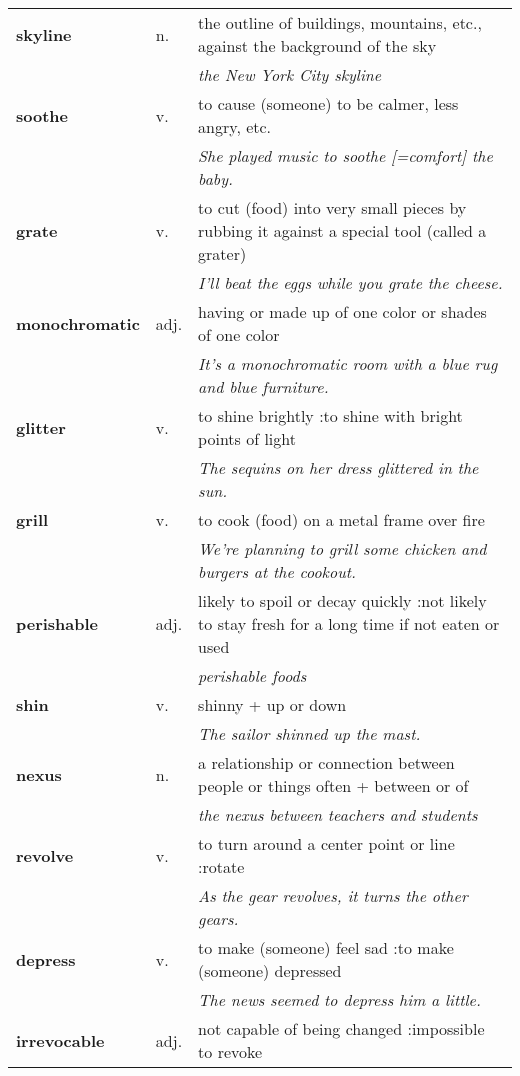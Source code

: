 \documentclass[a4paper]{article}
\begin{document}
\begin{longtable}{llp{12cm}}
\textbf{skyline} & n. &  the outline of buildings, mountains, etc., against the background of the sky \\
 & & \textit{the New York City skyline}\\[0.08cm]
\textbf{soothe} & v. &  to cause (someone) to be calmer, less angry, etc. \\
 & & \textit{She played music to soothe [=comfort] the baby.}\\[0.08cm]
\textbf{grate} & v. &  to cut (food) into very small pieces by rubbing it against a special tool (called a grater) \\
 & & \textit{I'll beat the eggs while you grate the cheese.}\\[0.08cm]
\textbf{monochromatic} & adj. &  having or made up of one color or shades of one color \\
 & & \textit{It's a monochromatic room with a blue rug and blue furniture.}\\[0.08cm]
\textbf{glitter} & v. &  to shine brightly :to shine with bright points of light \\
 & & \textit{The sequins on her dress glittered in the sun.}\\[0.08cm]
\textbf{grill} & v. &  to cook (food) on a metal frame over fire \\
 & & \textit{We're planning to grill some chicken and burgers at the cookout.}\\[0.08cm]
\textbf{perishable} & adj. &  likely to spoil or decay quickly :not likely to stay fresh for a long time if not eaten or used \\
 & & \textit{perishable foods}\\[0.08cm]
\textbf{shin} & v. &  shinny + up or down \\
 & & \textit{The sailor shinned up the mast.}\\[0.08cm]
\textbf{nexus} & n. &  a relationship or connection between people or things often + between or of \\
 & & \textit{the nexus between teachers and students}\\[0.08cm]
\textbf{revolve} & v. &  to turn around a center point or line :rotate \\
 & & \textit{As the gear revolves, it turns the other gears.}\\[0.08cm]
\textbf{depress} & v. &  to make (someone) feel sad :to make (someone) depressed \\
 & & \textit{The news seemed to depress him a little.}\\[0.08cm]
\textbf{irrevocable} & adj. &  not capable of being changed :impossible to revoke \\

\end{longtable}
\end{document}
